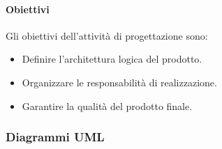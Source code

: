 		\paragraph{Obiettivi}\label{PP:Sviluppo:Progettazione:Obiettivi}
        Gli obiettivi dell'attività di progettazione sono:
        \begin{itemize}
			\item Definire l'architettura logica del prodotto.
			\item Organizzare le responsabilità di realizzazione.
			\item Garantire la qualità del prodotto finale.
		\end{itemize}
        

		\subsubsection{Diagrammi UML}\label{PP:Sviluppo:UML} %
               
